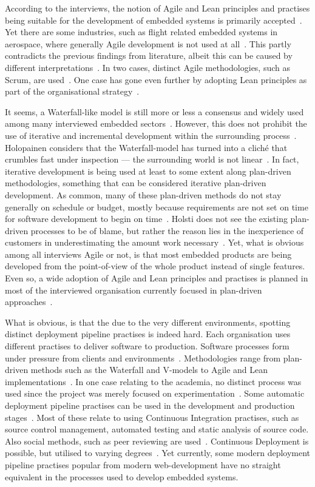 \documentclass[english]{tktltiki2}
\begin{document}
According to the interviews, the notion of Agile and Lean principles and practises being suitable for the development of embedded systems is primarily accepted~\cite{Hol15a, Koi15, Kri15, Pet15}. Yet there are some industries, such as flight related embedded systems in aerospace, where generally Agile development is not used at all~\cite{Hol15b}. This partly contradicts the previous findings from literature, albeit this can be caused by different interpretations~\cite{LB03}. In two cases, distinct Agile methodologies, such as Scrum, are used~\cite{BT15, Pet15}. One case has gone even further by adopting Lean principles as part of the organisational strategy~\cite{BT15}.

It seems, a Waterfall-like model is still more or less a consensus and widely used among many interviewed embedded sectors~\cite{Hol15b, Koi15}. However, this does not prohibit the use of iterative and incremental development within the surrounding process~\cite{Hol15b}. Holopainen considers that the Waterfall-model has turned into a cliché that crumbles fast under inspection — the surrounding world is not linear~\cite{Hol15a}. In fact, iterative development is being used at least to some extent along plan-driven methodologies, something that can be considered iterative plan-driven development. As common, many of these plan-driven methods do not stay generally on schedule or budget, mostly because requirements are not set on time for software development to begin on time~\cite{Hol15b}. Holsti does not see the existing plan-driven processes to be of blame, but rather the reason lies in the inexperience of customers in underestimating the amount work necessary~\cite{Hol15b}. Yet, what is obvious among all interviews Agile or not, is that most embedded products are being developed from the point-of-view of the whole product instead of single features. Even so, a wide adoption of Agile and Lean principles and practises is planned in most of the interviewed organisation currently focused in plan-driven approaches~\cite{Koi15}.

What is obvious, is that the due to the very different environments, spotting distinct deployment pipeline practises is indeed hard. Each organisation uses different practises to deliver software to production. Software processes form under pressure from clients and environments~\cite{Hol15a, Hol15b}. Methodologies range from plan-driven methods such as the Waterfall and V-models to Agile and Lean implementations~\cite{Hol15b, Koi15}. In one case relating to the academia, no distinct process was used since the project was merely focused on experimentation~\cite{Kri15}. Some automatic deployment pipeline practises can be used in the development and production stages~\cite{BT15, Hol15a, Hol15b, Koi15, Pet15}. Most of these relate to using Continuous Integration practises, such as source control management, automated testing and static analysis of source code. Also social methods, such as peer reviewing are used~\cite{Hol15b}. Continuous Deployment is possible, but utilised to varying degrees~\cite{Hol15a, Hol15b, Koi15}. Yet currently, some modern deployment pipeline practises popular from modern web-development have no straight equivalent in the processes used to develop embedded systems.
\end{document}

